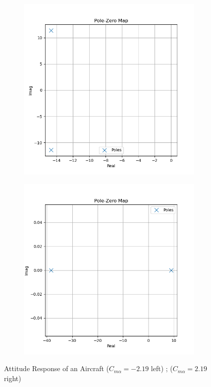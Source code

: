 \begin{figure}[H]
\centering
\begin{subfigure}[b]{0.48\textwidth}
\centering
\includegraphics[width=\linewidth]{Figures/aircraft_dynamics_poles_stable.png}
\end{subfigure}
\hfill
\begin{subfigure}[b]{0.48\textwidth}
\centering
\includegraphics[width=\linewidth]{Figures/aircraft_dynamics_poles_unstable.png}
\end{subfigure}
\caption{Attitude Response of an Aircraft ($C_{m\alpha}=-2.19$ left) ; ($C_{m\alpha}=2.19$ right)}
\label{f:aircraft_poles}
\end{figure}
